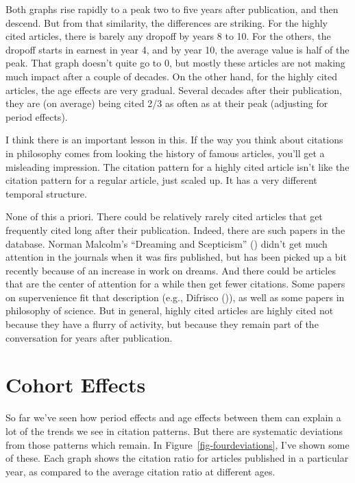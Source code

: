 \documentclass[
  12pt,
  letterpaper,
  DIV=11,
  numbers=noendperiod]{scrartcl}
\begin{document}
Both graphs rise rapidly to a peak two to five years after publication,
and then descend. But from that similarity, the differences are
striking. For the highly cited articles, there is barely any dropoff by
years 8 to 10. For the others, the dropoff starts in earnest in year 4,
and by year 10, the average value is half of the peak. That graph
doesn't quite go to 0, but mostly these articles are not making much
impact after a couple of decades. On the other hand, for the highly
cited articles, the age effects are very gradual. Several decades after
their publication, they are (on average) being cited 2/3 as often as at
their peak (adjusting for period effects).

I think there is an important lesson in this. If the way you think about
citations in philosophy comes from looking the history of famous
articles, you'll get a misleading impression. The citation pattern for a
highly cited article isn't like the citation pattern for a regular
article, just scaled up. It has a very different temporal structure.

None of this a priori. There could be relatively rarely cited articles
that get frequently cited long after their publication. Indeed, there
are such papers in the database. Norman Malcolm's ``Dreaming and
Scepticism'' () didn't get
much attention in the journals when it was firs published, but has been
picked up a bit recently because of an increase in work on dreams. And
there could be articles that are the center of attention for a while
then get fewer citations. Some papers on supervenience fit that
description (e.g., Difrisco ()),
as well as some papers in philosophy of science. But in general, highly
cited articles are highly cited not because they have a flurry of
activity, but because they remain part of the conversation for years
after publication.

\section{Cohort Effects}\label{sec-cohort}

So far we've seen how period effects and age effects between them can
explain a lot of the trends we see in citation patterns. But there are
systematic deviations from those patterns which remain. In
Figure~\ref{fig-fourdeviations}, I've shown some of these. Each graph
shows the citation ratio for articles published in a particular year, as
compared to the average citation ratio at different ages.
\end{document}
